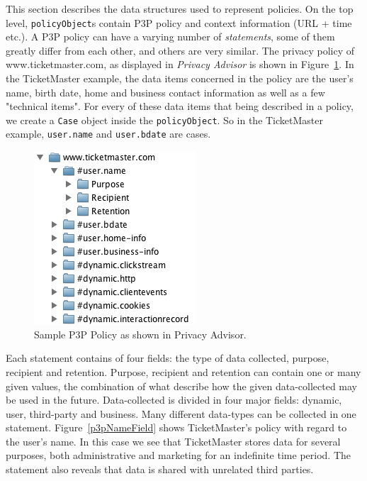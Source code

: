 This section describes the data structures used to represent policies. On the top level, \texttt{policyObject}s contain P3P policy and context information (URL + time etc.). A P3P policy can have a varying number of \emph{statements}, some of them greatly differ from each other, and others are very similar. The privacy policy of www.ticketmaster.com, as displayed in \emph{Privacy Advisor} is shown in Figure~\ref{p3pPol}. In the TicketMaster example, the data items concerned in the policy are the user's name, birth date, home and business contact information as well as a few "technical items". For every of these data items that being described in a policy, we create a \texttt{Case} object inside the \texttt{policyObject}. So in the TicketMaster example, \texttt{user.name} and \texttt{user.bdate} are cases.

\begin{figure}[htbp]
\begin{center}
\includegraphics{Implementation/p3p_pol}
\caption{Sample P3P Policy as shown in Privacy Advisor.}
\label{p3pPol}
\end{center}
\end{figure}

Each statement contains of four fields: the type of data collected, purpose, recipient and retention. Purpose, recipient and retention can contain one or many given values, the combination of what describe how the given data-collected may be used in the future. Data-collected is divided in four major fields: dynamic, user, third-party and business. Many different data-types can be collected in one statement. Figure~\ref{p3pNameField} shows TicketMaster's policy with regard to the user's name. In this case we see that TicketMaster stores data for several purposes, both administrative and marketing for an indefinite time period. The statement also reveals that data is shared with unrelated third parties.

